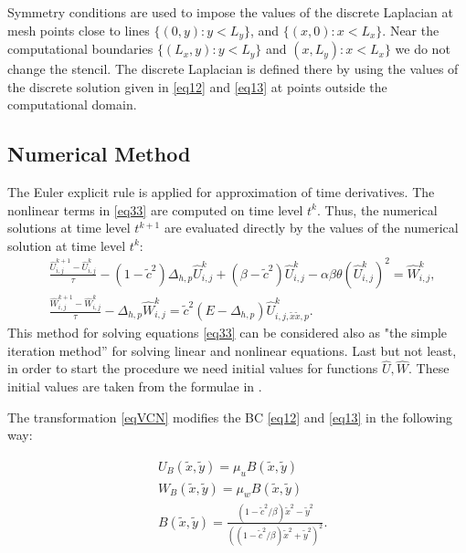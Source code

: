 \documentclass[12pt]{article}
\theoremstyle{theorem}
\theoremstyle{defi}
\begin{document}
Symmetry conditions are used to impose the values of the discrete Laplacian at mesh points close to lines $\{(0,y) : y < L_y\}$, and $\{(x,0) : x < L_x\}$. 
Near  the computational boundaries $\{(L_x,y):y<L_y\}$ and $(x,L_y):x<L_x\}$ we do not change the stencil. The discrete Laplacian
is defined  there by using the values of the discrete solution given in \eqref{eq12} and \eqref{eq13} at points outside the computational domain.

\subsection{Numerical Method}

The Euler explicit rule is applied for approximation of  time derivatives. The nonlinear terms in \eqref{eq33} are computed on time level $t^k$. Thus, the numerical solutions at time level $t^{k+1}$ are evaluated directly by the values of the numerical solution at time level $t^k$:  
 \begin{equation}\label{eq34}
 \begin{split}
   &\frac {\widehat{U}_{i,j}^{k+1}-\widehat{U}_{i,j}^{k}}{\tau}- (1-\tilde c^2 ) \Delta_{h,p} \widehat{U} _{i,j}^{k}+  (\beta-\tilde c^2 ) \widehat{U}_{i,j}^{k} - \alpha \beta \theta (\widehat{U}_{i,j}^{k})^2 = \widehat{W}_{i,j}^{k}, \\
  &\frac  {\widehat{W}_{i,j}^{k+1} -\widehat{W}_{i,j}^{k}} {\tau} - \Delta_{h,p} \widehat{W}_{i,j}^{k} =  \tilde c^2 (E- \Delta_{h,p})       
    \widehat{U}_{i,j,{\tilde x \tilde x,p}}^{k}. 
\end{split}
\end{equation}
This method for solving equations 
\eqref{eq33} can be considered also as "the simple iteration method'' for solving linear and nonlinear equations.
Last but not least, in order to start the procedure we need initial values for functions $\widehat{U},\widehat{W}$. These initial values are taken from the formulae in \cite{ref10}.

The transformation \eqref{eqVCN} modifies the BC \eqref{eq12} and \eqref{eq13} in the following way:

\begin{equation}\label{eqBCVC}
\begin{split}
&U_B(\tilde{x} , \tilde y) = \mu_u B( \tilde x, \tilde y) \\
&W_B(\tilde{x} , \tilde y) = \mu_w B( \tilde x, \tilde y) \\
&B(\tilde{x} , \tilde y) = \frac{ (1 - \tilde c^2/ \beta) \tilde x^2 - \tilde y^2}{( (1 - \tilde c^2/ \beta) \tilde x^2 + \tilde y^2)^2}. 
\end{split}
\end{equation}
\end{document}
